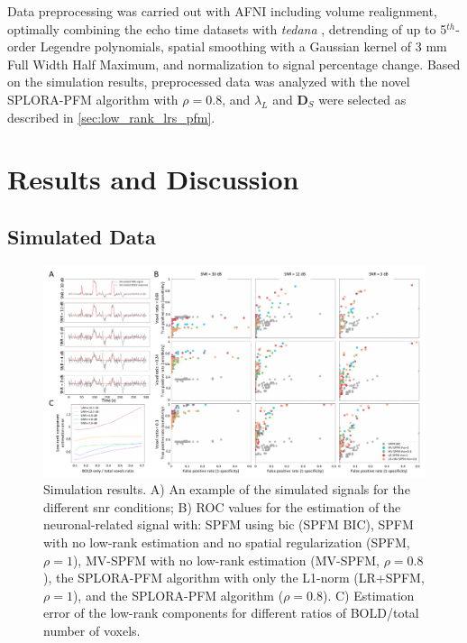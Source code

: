 Data preprocessing was carried out with AFNI \citep{Cox1996AFNISoftwareAnalysis}
including volume realignment, optimally combining the echo time datasets with
\textit{tedana} \citep{DuPre2021TEdependentanalysis}, detrending of up to
5$^{th}$-order Legendre polynomials, spatial smoothing with a Gaussian kernel of
3 mm Full Width Half Maximum, and normalization to signal percentage change.
Based on the simulation results, preprocessed data was analyzed with the novel
SPLORA-PFM algorithm with $\rho = 0.8$, and $\lambda_L$ and $\mathbf{D}_S$ were
selected as described in \cref{sec:low_rank_lrs_pfm}.

\section{Results and Discussion}
\label{sec:low_rank_results}

\subsection{Simulated Data}

\begin{figure}[th!]
    \centering
    \includegraphics[width=\textwidth]{figures/low_rank/figure_1_v6.pdf}
    \caption{Simulation results. A) An example of the simulated signals for the
    different \acrshort*{snr} conditions; B) ROC values for the estimation of
    the neuronal-related signal with: SPFM using \acrshort*{bic} (SPFM BIC),
    SPFM with no low-rank estimation and no spatial regularization (SPFM,
    $\rho=1$), MV-SPFM with no low-rank estimation (MV-SPFM, $\rho = 0.8$), the
    SPLORA-PFM algorithm with only the L1-norm (LR+SPFM, $\rho=1$), and the
    SPLORA-PFM algorithm ($\rho = 0.8$). C) Estimation error of the low-rank
    components for different ratios of BOLD/total number of voxels.}
    \label{fig:low_rank_1}
\end{figure}


